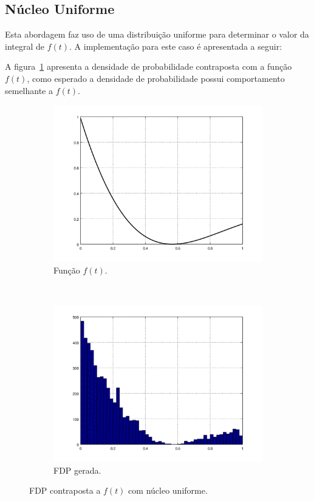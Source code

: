 \documentclass [a4paper,10pt]{article}
\begin{document}
	\subsection{Núcleo Uniforme}
  		Esta abordagem faz uso de uma distribuição uniforme para determinar o valor da integral de $f(t)$.
		A implementação para este caso é apresentada a seguir:
    	{\linespread{1.15}
    	}

		A figura~\ref{uniform} apresenta a densidade de probabilidade contraposta com a função $f(t)$, como
		esperado a densidade de probabilidade possui comportamento semelhante a $f(t)$.
		  \begin{figure}[!ht]
			\centering
			\begin{subfigure}[!hb]{0.5\textwidth}
			  \centering
			  \includegraphics[width=\textwidth]{graph.png}
			  \caption{Função $f(t)$.}
			\end{subfigure}%
			~
			\begin{subfigure}[!hb]{0.5\textwidth}
			  \centering
			  \includegraphics[width=\textwidth]{uniform.png}
			  \caption{FDP gerada.}
			\end{subfigure}
			\caption{FDP contraposta a $f(t)$ com núcleo uniforme.\label{uniform}}
		  \end{figure}
		  
\end{document}
